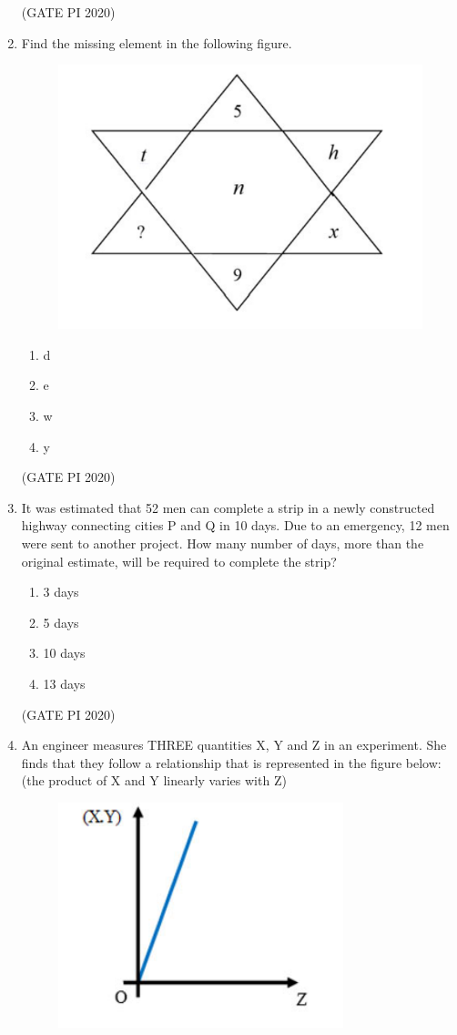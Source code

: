 \documentclass[journal,12pt,onecolumn]{IEEEtran}
\theoremstyle{remark}
\begin{document}
\begin{enumerate}
\hfill (GATE PI 2020)

\item Find the missing element in the following figure.

\begin{figure}[h]
    \centering
    \includegraphics[width=0.5\columnwidth]{figs/fig2.png}
    \caption{}
    \label{fig:placeholder}
\end{figure} 


\begin{enumerate}
    \item d
    \item e
    \item w
    \item y
\end{enumerate}

\hfill (GATE PI 2020)

\item It was estimated that 52 men can complete a strip in a newly constructed highway connecting cities P and Q in 10 days. Due to an emergency, 12 men were sent to another project. How many number of days, more than the original estimate, will be required to complete the strip?
\begin{enumerate}
    \item 3 days
    \item 5 days
    \item 10 days
    \item 13 days
\end{enumerate}

\hfill (GATE PI 2020)

\item An engineer measures THREE quantities X, Y and Z in an experiment. She finds that they follow a relationship that is represented in the figure below: (the product of X and Y linearly varies with Z)
\newpage

\begin{figure}[h]
    \centering
    \includegraphics[width=0.5\columnwidth]{figs/fig3.png}
    \caption{}
    \label{fig:placeholder}
\end{figure} 



\end{enumerate}
\end{document}
